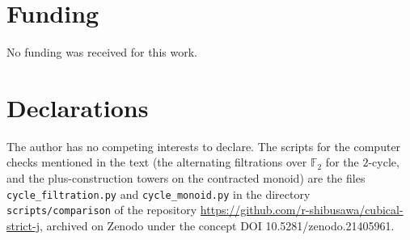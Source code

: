\documentclass[11pt]{amsart}
\theoremstyle{definition}
\begin{document}
\section*{Funding}
No funding was received for this work.

\section*{Declarations}
The author has no competing interests to declare.
The scripts for the computer checks mentioned in the text (the
alternating filtrations over $\mathbb F_2$ for the $2$-cycle, and the
plus-construction towers on the contracted monoid) are the files
\texttt{cycle\_filtration.py} and \texttt{cycle\_monoid.py} in the directory
\texttt{scripts/comparison} of the repository
\url{https://github.com/r-shibusawa/cubical-strict-j}, archived on Zenodo
under the concept DOI 10.5281/zenodo.21405961.
\end{document}
